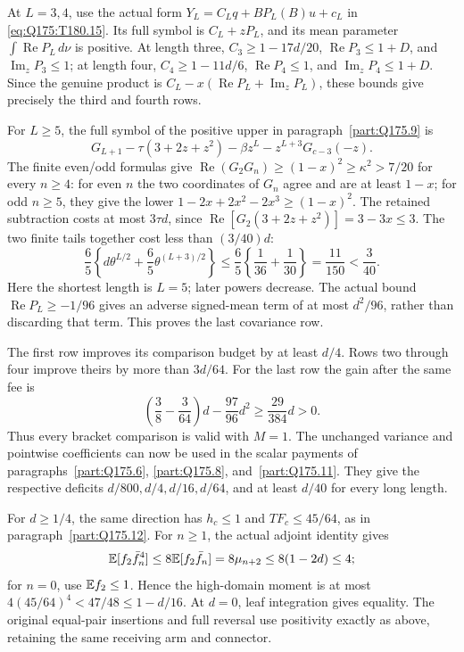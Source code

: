 At \(L=3,4\), use the actual form
\(Y_L=C_Lq+BP_L(B)u+c_L\) in
\eqref{eq:Q175:T180.15}. Its full symbol is \(C_L+zP_L\),
and its mean parameter \(\int\operatorname{Re}P_L\,d\nu\)
is positive. At length three,
\(C_3\ge1-17d/20\), \(\operatorname{Re}P_3\le1+D\), and
\(\operatorname{Im}_zP_3\le1\); at length four,
\(C_4\ge1-11d/6\), \(\operatorname{Re}P_4\le1\), and
\(\operatorname{Im}_zP_4\le1+D\).
Since the genuine product is
\(C_L-x(\operatorname{Re}P_L+\operatorname{Im}_zP_L)\),
these bounds give precisely the third and fourth rows.

For \(L\ge5\), the full symbol of the positive upper in
paragraph~\ref{part:Q175.9} is
\[
 G_{L+1}-\tau(3+2z+z^2)
       -\beta z^L-z^{L+3}G_{c-3}(-z).
\]
The finite even/odd formulas give
\(\operatorname{Re}(G_2G_n)\ge(1-x)^2\ge\kappa^2>7/20\)
for every \(n\ge4\): for even \(n\) the two coordinates of
\(G_n\) agree and are at least \(1-x\); for odd \(n\ge5\), they
give the lower \(1-2x+2x^2-2x^3\ge(1-x)^2\).
The retained subtraction costs at most \(3\tau d\), since
\(\operatorname{Re}[G_2(3+2z+z^2)]=3-3x\le3\).
The two finite tails together cost less than \((3/40)d\):
\[
 \frac65\left\{d\theta^{L/2}+\frac65\theta^{(L+3)/2}\right\}
 \le\frac65\left\{\frac1{36}+\frac1{30}\right\}
 =\frac{11}{150}<\frac3{40}.
\]
Here the shortest length is \(L=5\); later powers decrease.
The actual bound \(\operatorname{Re}P_L\ge-1/96\) gives an
adverse signed-mean term of at most \(d^2/96\), rather than
discarding that term. This proves the last covariance row.

The first row improves its comparison budget by at least \(d/4\).
Rows two through four improve theirs by more than \(3d/64\).
For the last row the gain after the same fee is
\[
 \left(\frac38-\frac3{64}\right)d-\frac{97}{96}d^2
 \ge\frac{29}{384}d>0.
\]
Thus every bracket comparison is valid with \(M=1\).
The unchanged variance and pointwise coefficients can now be
used in the scalar payments of paragraphs~\ref{part:Q175.6},
\ref{part:Q175.8}, and~\ref{part:Q175.11}. They give the
respective deficits \(d/800,d/4,d/16,d/64\), and at least
\(d/40\) for every long length.

For \(d\ge1/4\), the same direction has \(h_c\le1\) and
\(TF_c\le45/64\), as in paragraph~\ref{part:Q175.12}.
For \(n\ge1\), the actual adjoint identity gives
\[
 \mathbb E[f_2\bar f_n^4]\le8\mathbb E[f_2\bar f_n]
 =8\mu_{n+2}\le8(1-2d)\le4;
\]
for \(n=0\), use \(\mathbb E f_2\le1\).
Hence the high-domain moment is at most
\(4(45/64)^4<47/48\le1-d/16\).
At \(d=0\), leaf integration gives equality.
The original equal-pair insertions and full reversal use positivity
exactly as above, retaining the same receiving arm and connector.

